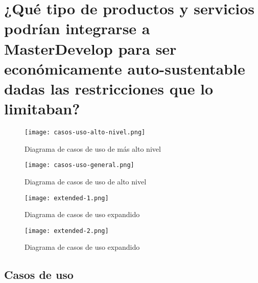 \documentclass{article}
\begin{document}
\section{¿Qué tipo de productos y servicios podrían 
integrarse a MasterDevelop para ser económicamente 
auto-sustentable dadas las restricciones que lo limitaban?}

\begin{figure}[ht]
	\centering
        \texttt{[image: casos-uso-alto-nivel.png]}
                 \caption{Diagrama de casos de uso de más alto nivel}
\end{figure}	

\begin{figure}[ht]
        \texttt{[image: casos-uso-general.png]}
                 \caption{Diagrama de casos de uso de alto nivel}
\end{figure}	

\begin{figure}[ht]
	\centering
        \texttt{[image: extended-1.png]}
                 \caption{Diagrama de casos de uso expandido}
\end{figure}	

\begin{figure}[ht]
	\centering
        \texttt{[image: extended-2.png]}
                 \caption{Diagrama de casos de uso expandido}
\end{figure}	

\clearpage
\subsection{Casos de uso}
\end{document}
